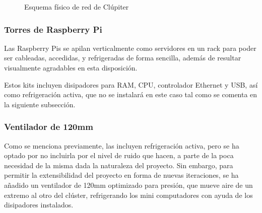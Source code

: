 \begin{figure}[h!]
  \centering
  \vspace{0.15cm}
  \def\svgwidth{0.9\textwidth}
  
  \caption{Esquema físico de red de Clúpiter}
  \label{fig:raspi_diagram_eth}
\end{figure}

\subsubsection{Torres de Raspberry Pi}
\label{sssec:torresrpi}
Las Raspberry Pis se apilan verticalmente como servidores en un rack para poder ser cableadas, accedidas, y refrigeradas de forma sencilla, además de resultar visualmente agradables en esta disposición.

Estos kits incluyen disipadores para RAM, CPU, controlador Ethernet y USB, así como refrigeración activa, que no se instalará en este caso tal como se comenta en la siguiente subsección.




\subsubsection{Ventilador de 120mm}
Como se menciona previamente, las  incluyen refrigeración activa, pero se ha optado por no incluirla por el nivel de ruido que hacen, a parte de la poca necesidad de la misma dada la naturaleza del proyecto. Sin embargo, para permitir la extensibilidad del proyecto en forma de nuevas iteraciones, se ha añadido un ventilador de 120mm optimizado para presión, que mueve aire de un extremo al otro del clúster, refrigerando los mini computadores con ayuda de los disipadores instalados.

